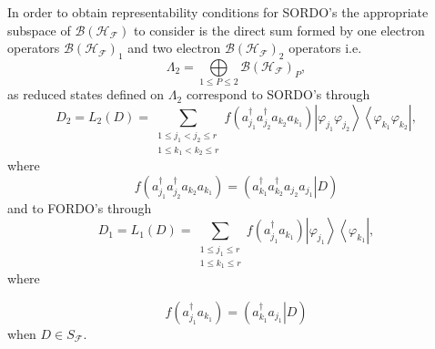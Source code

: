 \documentclass[aps,preprint]{revtex4}%
\begin{document}
In order to obtain representability conditions for SORDO's the appropriate
subspace of $\mathcal{B}\left(  \mathcal{H}_{\mathcal{F}}\right)  $ to
consider is the direct sum formed by one electron operators $\mathcal{B}%
\left(  \mathcal{H}_{\mathcal{F}}\right)  _{1}$ and two electron
$\mathcal{B}\left(  \mathcal{H}_{\mathcal{F}}\right)  _{2}$ operators i.e.
\begin{equation}
\Lambda_{2}=%
{\displaystyle\bigoplus\limits_{1\leq P\leq2}}
\mathcal{B}\left(  \mathcal{H}_{\mathcal{F}}\right)  _{P},
\end{equation}
as reduced states defined on $\Lambda_{2}$ correspond to SORDO's through%
\begin{equation}
D_{2}=L_{2}\left(  D\right)  =\sum_{\substack{1\leq j_{1}<j_{2}\leq r\\1\leq
k_{1}<k_{2}\leq r}}f\left(  a_{j_{1}}^{\dagger}a_{j_{2}}^{\dagger}a_{k_{2}%
}a_{k_{1}}\right)  \left\vert \varphi_{j_{1}}\varphi_{j_{2}}\right\rangle
\left\langle \varphi_{k_{1}}\varphi_{k_{2}}\right\vert ,
\end{equation}
where%
\begin{equation}
f\left(  a_{j_{1}}^{\dagger}a_{j_{2}}^{\dagger}a_{k_{2}}a_{k_{1}}\right)
=\left(  \left.  a_{k_{1}}^{\dagger}a_{k_{2}}^{\dagger}a_{j_{2}}a_{j_{1}%
}\right\vert D\right)
\end{equation}
and to FORDO's through
\begin{equation}
D_{1}=L_{1}\left(  D\right)  =\sum_{\substack{1\leq j_{1}\leq r\\1\leq
k_{1}\leq r}}f\left(  a_{j_{1}}^{\dagger}a_{k_{1}}\right)  \left\vert
\varphi_{j_{1}}\right\rangle \left\langle \varphi_{k_{1}}\right\vert ,
\end{equation}
where%

\begin{equation}
f\left(  a_{j_{1}}^{\dagger}a_{k_{1}}\right)  =\left(  \left.  a_{k_{1}%
}^{\dagger}a_{j_{1}}\right\vert D\right)
\end{equation}
when $D\in S_{\mathcal{F}}.$
\end{document}
